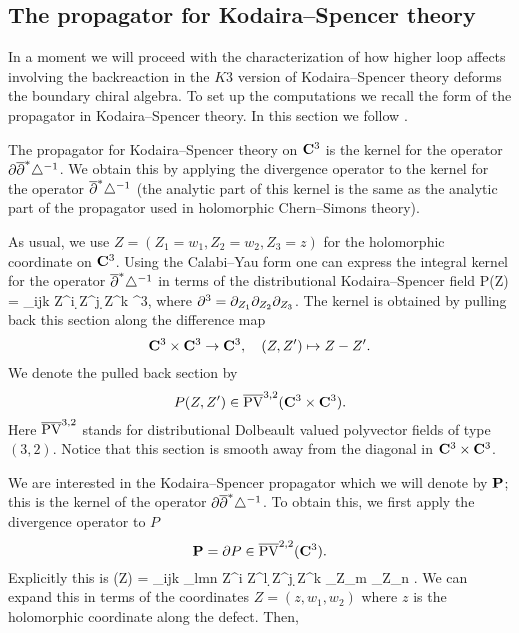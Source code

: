 \documentclass[../main.tex]{subfiles}
\begin{document}
\subsection{The propagator for Kodaira--Spencer theory}

In a moment we will proceed with the characterization of how higher loop affects involving the backreaction in the $K3$ version of Kodaira--Spencer theory deforms the boundary chiral algebra.
To set up the computations we recall the form of the propagator in Kodaira--Spencer theory.
In this section we follow \cite{CLbcov1}.

The propagator for Kodaira--Spencer theory on $\mathbf{C}^3$ is the kernel for the operator $\partial \overline{\partial}^* \triangle^{-1}$. 
We obtain this by applying the divergence operator to the kernel for the operator $\overline{\partial}^* \triangle^{-1}$ (the analytic part of this kernel is the same as the analytic part of the propagator used in holomorphic Chern--Simons theory). 

As usual, we use $Z = (Z_1 = w_1, Z_2=w_2,Z_3=z)$ for the holomorphic coordinate on $\mathbf{C}^3$.
Using the Calabi--Yau form one can express the integral kernel for the operator $\overline{\partial}^* \triangle^{-1}$ in terms of the distributional Kodaira--Spencer field
\beqn
P(Z) =  \ep_{ijk} \br Z^{i} \d \br Z^j \d \br Z^k \del^3,
\eeqn
where $\partial^3 = \partial_{Z_1} \partial_{Z_2} \partial_{Z_3}$.
The kernel is obtained by pulling back this section along the difference map 
\[
\mathbf{C}^3 \times \mathbf{C}^3 \to \mathbf{C}^3,\quad (Z,Z') \mapsto Z - Z' .
\]
We denote the pulled back section by
\[
P(Z,Z') \in \overline{{\rm PV}}^{3,2}(\mathbf{C}^3 \times \mathbf{C}^3) . 
\]
Here $\overline{{\rm PV}}^{3,2}$ stands for distributional Dolbeault valued polyvector fields of type $(3,2)$.
Notice that this section is smooth away from the diagonal in $\mathbf{C}^3 \times \mathbf{C}^3$. 

We are interested in the Kodaira--Spencer propagator which we will denote by $\bf P$; this is the kernel of the operator $\partial \overline{\partial}^* \triangle^{-1}$. 
To obtain this, we first apply the divergence operator to $P$ 
\[
\mathbf{P} = \partial P \in \overline{{\rm PV}}^{2,2}(\mathbf{C}^3) .
\]
Explicitly this is
\beqn
\bP (Z) =  \ep_{ijk} \ep_{lmn} \br Z^{i} \br Z^l \d \br Z^j \d \br Z^k \del_{Z_m} \del_{Z_n} .
\eeqn
We can expand this in terms of the coordinates $Z = (z,w_1,w_2)$ where $z$ is the holomorphic coordinate along the defect.
Then, 
\end{document}
